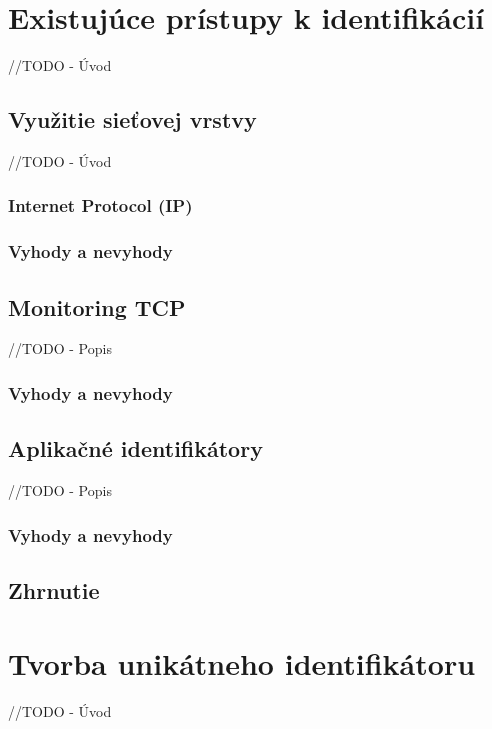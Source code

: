\documentclass[
  printed, %
  table,   %
  lof,     %
  lot,     %
]{fithesis3}
\begin{document}



\chapter{Existujúce prístupy k identifikácií}
\label{ch:existing}
//TODO - Úvod
\section{Využitie sieťovej vrstvy}
//TODO - Úvod
\subsection{Internet Protocol (IP)}
\subsection{Vyhody a nevyhody}
\section{Monitoring TCP}
//TODO - Popis
\subsection{Vyhody a nevyhody}
\section{Aplikačné identifikátory}
//TODO - Popis
\subsection{Vyhody a nevyhody}
\section{Zhrnutie}

\chapter{Tvorba unikátneho identifikátoru}
\label{ch:footprint}
//TODO - Úvod
\end{document}

